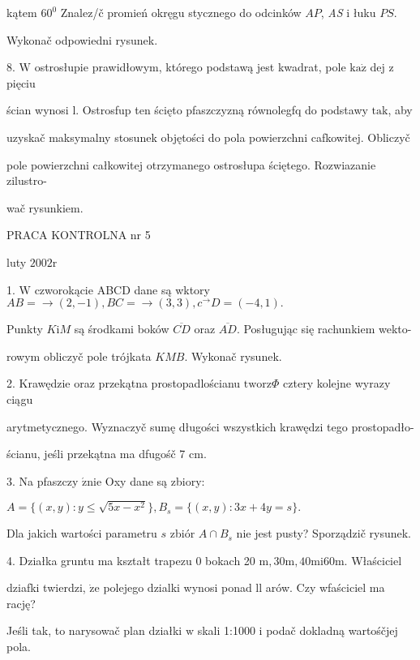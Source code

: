 \documentclass[a4paper,12pt]{article}
\begin{document}
kątem $60^{0}$ Znalez/č promień okręgu stycznego do odcinków $AP$, {\it AS} $\mathrm{i}$ łuku $PS.$

Wykonač odpowiedni rysunek.

8. $\mathrm{W}$ ostrosłupie prawidłowym, którego podstawą jest kwadrat, pole $\mathrm{k}\mathrm{a}\dot{\mathrm{z}}$ dej $\mathrm{z}$ pięciu

ścian wynosi l. Ostrosfup ten ścięto pfaszczyzną równolegfq do podstawy $\mathrm{t}\mathrm{a}\mathrm{k}$, aby

uzyskač maksymalny stosunek objętości do pola powierzchni cafkowitej. Obliczyč

pole powierzchni całkowitej otrzymanego ostrosłupa ściętego. Rozwiazanie zilustro-

wač rysunkiem.





PRACA KONTROLNA nr 5

luty $2002\mathrm{r}$

1. $\mathrm{W}$ czworokącie ABCD dane są wktory $AB=\rightarrow(2,-1), BC=\rightarrow(3,3), c^{\rightarrow}D=(-4,1).$

Punkty $K\mathrm{i}M$ są środkami boków $\overline{CD}$ oraz $\overline{AD}$. Posługując się rachunkiem wekto-

rowym obliczyč pole trójkata $KMB$. Wykonač rysunek.

2. Krawędzie oraz przekątna prostopadlościanu $\mathrm{t}\mathrm{w}\mathrm{o}\mathrm{r}\mathrm{z}\Phi$ cztery kolejne wyrazy ciągu

arytmetycznego. Wyznaczyč sumę długości wszystkich krawędzi tego prostopadło-

ścianu, jeśli przekątna ma dfugośč 7 cm.

3. Na pfaszczy $\acute{\mathrm{z}}\mathrm{n}\mathrm{i}\mathrm{e}$ Oxy dane są zbiory:

$A=\{(x,y):y\leq\sqrt{5x-x^{2}}\},B_{s}=\{(x,y):3x+4y=s\}.$

Dla jakich wartości parametru $s$ zbiór $A\cap B_{s}$ nie jest pusty? Sporządzič rysunek.

4. Działka gruntu ma kształt trapezu $0$ bokach 20 $\mathrm{m}, 30\mathrm{m}, 40\mathrm{m}\mathrm{i}60\mathrm{m}$. Właściciel

dziafki twierdzi, $\dot{\mathrm{z}}\mathrm{e}$ polejego dzialki wynosi ponad ll arów. Czy wfaściciel ma rację?

Jeśli tak, to narysowač plan działki $\mathrm{w}$ skali 1:1000 $\mathrm{i}$ podač dokladną wartośčjej pola.
\end{document}
